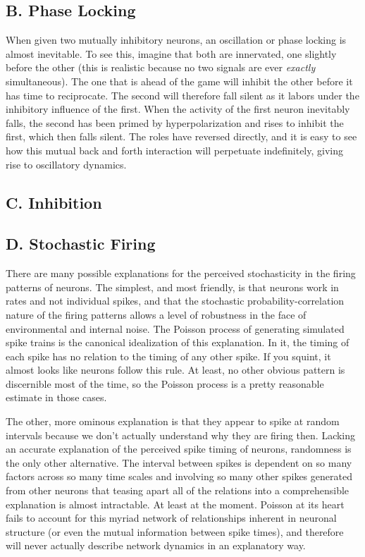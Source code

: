 \documentclass[12pt]{article}
\begin{document}
\subsection{B. Phase Locking}

When given two mutually inhibitory neurons, an oscillation or phase locking is almost inevitable.  To see this, imagine that both are innervated, one slightly before the other (this is realistic because no two signals are ever {\em exactly} simultaneous).  The one that is ahead of the game will inhibit the other before it has time to reciprocate.  The second will therefore fall silent as it labors under the inhibitory influence of the first.  When the activity of the first neuron inevitably falls, the second has been primed by hyperpolarization and rises to inhibit the first, which then falls silent.  The roles have reversed directly, and it is easy to see how this mutual back and forth interaction will perpetuate indefinitely, giving rise to oscillatory dynamics.

\subsection{C. Inhibition}



\subsection{D. Stochastic Firing}

There are many possible explanations for the perceived stochasticity in the firing patterns of neurons.  The simplest, and most friendly, is that neurons work in rates and not individual spikes, and that the stochastic probability-correlation nature of the firing patterns allows a level of robustness in the face of environmental and internal noise.  The Poisson process of generating simulated spike trains is the canonical idealization of this explanation.  In it, the timing of each spike has no relation to the timing of any other spike.  If you squint, it almost looks like neurons follow this rule.  At least, no other obvious pattern is discernible most of the time, so the Poisson process is a pretty reasonable estimate in those cases.  

The other, more ominous explanation is that they appear to spike at random intervals because we don't actually understand why they are firing then.  Lacking an accurate explanation of the perceived spike timing of neurons, randomness is the only other alternative.  The interval between spikes is dependent on so many factors across so many time scales and involving so many other spikes generated from other neurons that teasing apart all of the relations into a comprehensible explanation is almost intractable.  At least at the moment.  Poisson at its heart fails to account for this myriad network of relationships inherent in neuronal structure (or even the mutual information between spike times), and therefore will never actually describe network dynamics in an explanatory way.  
\end{document}
